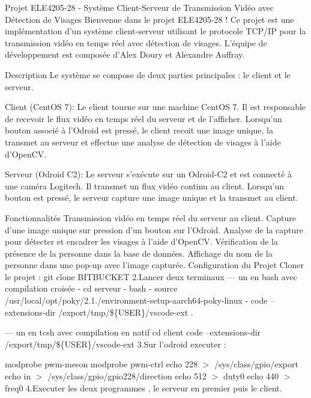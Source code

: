 Projet E\-L\-E4205-\/28 -\/ Système Client-\/\-Serveur de Transmission Vidéo avec Détection de Visages Bienvenue dans le projet E\-L\-E4205-\/28 ! Ce projet est une implémentation d'un système client-\/serveur utilisant le protocole T\-C\-P/\-I\-P pour la transmission vidéo en temps réel avec détection de visages. L'équipe de développement est composée d'Alex Doury et Alexandre Auffray.

Description Le système se compose de deux parties principales \-: le client et le serveur.

Client (Cent\-O\-S 7)\-: Le client tourne sur une machine Cent\-O\-S 7. Il est responsable de recevoir le flux vidéo en temps réel du serveur et de l'afficher. Lorsqu'un bouton associé à l'Odroid est pressé, le client recoit une image unique, la transmet au serveur et effectue une analyse de détection de visages à l'aide d'Open\-C\-V.

Serveur (Odroid C2)\-: Le serveur s'exécute sur un Odroid-\/\-C2 et est connecté à une caméra Logitech. Il transmet un flux vidéo continu au client. Lorsqu'un bouton est pressé, le serveur capture une image unique et la transmet au client.

Fonctionnalités Transmission vidéo en temps réel du serveur au client. Capture d'une image unique sur pression d'un bouton sur l'Odroid. Analyse de la capture pour détecter et encadrer les visages à l'aide d'Open\-C\-V. Vérification de la présence de la personne dans la base de données. Affichage du nom de la personne dans une pop-\/up avec l'image capturée. Configuration du Projet Cloner le projet \-: git clone B\-I\-T\-B\-U\-C\-K\-E\-T 2.\-Lancer deux terminaux — un en bash avec compilation croisée -\/ cd serveur -\/ bash -\/ source /usr/local/opt/poky/2.1./environment-\/setup-\/aarch64-\/poky-\/linux -\/ code --extensions-\/dir /export/tmp/\$\{U\-S\-E\-R\}/vscode-\/ext .

— un en tcsh avec compilation en natif cd client code --extensions-\/dir /export/tmp/\$\{U\-S\-E\-R\}/vscode-\/ext 3.\-Sur l'odroid executer \-:

modprobe pwm-\/meson modprobe pwm-\/ctrl echo 228 $>$ /sys/class/gpio/export echo in $>$ /sys/class/gpio/gpio228/direction echo 512 $>$ duty0 echo 440 $>$ freq0 4.\-Executer les deux programmes , le serveur en premier puis le client. 